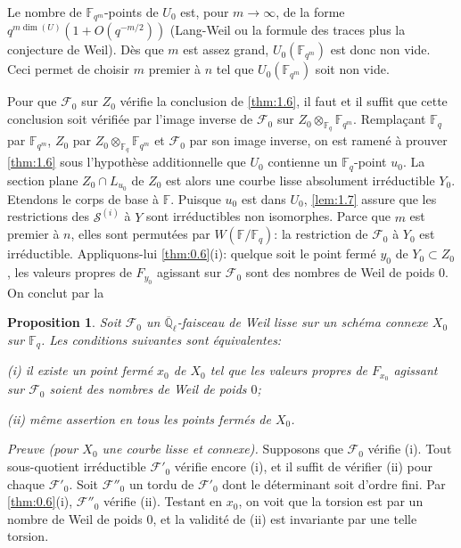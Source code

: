 \documentclass[11pt,a4paper]{article}
\theoremstyle{plain}
\newtheorem{proposition}[theorem]{Proposition}
\theoremstyle{definition}
\begin{document}
Le nombre de $\mathbb{F}_{q^m}$-points de $U_0$ est, pour $m \to \infty$, de la forme $q^{m\dim(U)}(1+O(q^{-m/2}))$ (Lang-Weil ou la formule des traces plus la conjecture de Weil). D\`es que $m$ est assez grand, $U_0(\mathbb{F}_{q^m})$ est donc non vide. Ceci permet de choisir $m$ premier \`a $n$ tel que $U_0(\mathbb{F}_{q^m})$ soit non vide.

Pour que $\mathcal{F}_0$ sur $Z_0$ v\'erifie la conclusion de \ref{thm:1.6}, il faut et il suffit que cette conclusion soit v\'erifi\'ee par l'image inverse de $\mathcal{F}_0$ sur $Z_0 \otimes_{\mathbb{F}_q} \mathbb{F}_{q^m}$. Rempla\c{c}ant $\mathbb{F}_q$ par $\mathbb{F}_{q^m}$, $Z_0$ par $Z_0 \otimes_{\mathbb{F}_q} \mathbb{F}_{q^m}$ et $\mathcal{F}_0$ par son image inverse, on est ramen\'e \`a prouver \ref{thm:1.6} sous l'hypoth\`ese additionnelle que $U_0$ contienne un $\mathbb{F}_q$-point $u_0$. La section plane $Z_0 \cap L_{u_0}$ de $Z_0$ est alors une courbe lisse absolument irr\'eductible $Y_0$. Etendons le corps de base \`a $\mathbb{F}$. Puisque $u_0$ est dans $U_0$, \ref{lem:1.7} assure que les restrictions des $\mathcal{S}^{(i)}$ \`a $Y$ sont irr\'eductibles non isomorphes. Parce que $m$ est premier \`a $n$, elles sont permut\'ees par $W(\mathbb{F}/\mathbb{F}_q)$: la restriction de $\mathcal{F}_0$ \`a $Y_0$ est irr\'eductible. Appliquons-lui \ref{thm:0.6}(i): quelque soit le point ferm\'e $y_0$ de $Y_0 \subset Z_0$, les valeurs propres de $F_{y_0}$ agissant sur $\mathcal{F}_0$ sont des nombres de Weil de poids $0$. On conclut par la

\begin{proposition}\label{prop:1.9}
Soit $\mathcal{F}_0$ un $\overline{\mathbb{Q}}_\ell$-faisceau de Weil lisse sur un sch\'ema connexe $X_0$ sur $\mathbb{F}_q$. Les conditions suivantes sont \'equivalentes:

\emph{(i)} il existe un point ferm\'e $x_0$ de $X_0$ tel que les valeurs propres de $F_{x_0}$ agissant sur $\mathcal{F}_0$ soient des nombres de Weil de poids $0$;

\emph{(ii)} m\^eme assertion en tous les points ferm\'es de $X_0$.
\end{proposition}

\noindent\textit{Preuve (pour $X_0$ une courbe lisse et connexe).} Supposons que $\mathcal{F}_0$ v\'erifie (i). Tout sous-quotient irr\'eductible $\mathcal{F}'_0$ v\'erifie encore (i), et il suffit de v\'erifier (ii) pour chaque $\mathcal{F}'_0$. Soit $\mathcal{F}''_0$ un tordu de $\mathcal{F}'_0$ dont le d\'eterminant soit d'ordre fini. Par \ref{thm:0.6}(i), $\mathcal{F}''_0$ v\'erifie (ii). Testant en $x_0$, on voit que la torsion est par un nombre de Weil de poids $0$, et la validit\'e de (ii) est invariante par une telle torsion.
\end{document}
